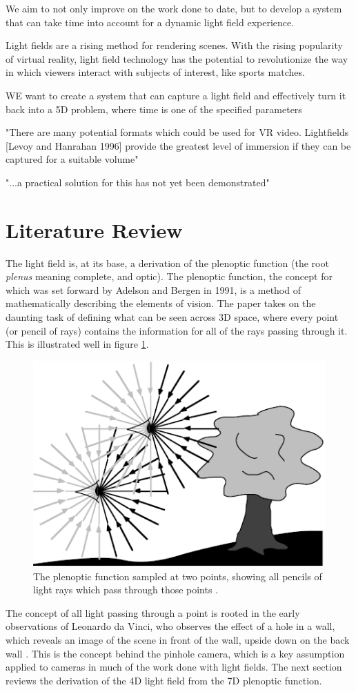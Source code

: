 \documentclass[12pt]{report}
\begin{document}
We aim to not only improve on the work done to date, but to develop a system that can take time into account for a dynamic light field experience. 

Light fields are a rising method for rendering scenes. With the rising popularity of virtual reality, light field technology has the potential to revolutionize the way in which viewers interact with subjects of interest, like sports matches.

WE want to create a system that can capture a light field and effectively turn it back into a 5D problem, where time is one of the specified parameters

"There are many potential formats which could be used for VR video.
Lightfields [Levoy and Hanrahan 1996] provide the greatest level of
immersion if they can be captured for a suitable volume"

"...a practical solution for this has not yet been demonstrated"

\chapter*{Literature Review}
The light field is, at its base, a derivation of the plenoptic function (the root \emph{plenus} meaning complete, and optic). The plenoptic function, the concept for which was set forward by Adelson and Bergen in 1991, is a method of mathematically describing the elements of vision. The paper takes on the daunting task of defining what can be seen across 3D space, where every point (or pencil of rays) contains the information for all of the rays passing through it.  This is illustrated well in figure  \ref{fig:plenoptic_visual}. 
\begin{figure}[!ht]
	\centering
	\includegraphics[scale=0.75]{plenoptic_image.png}
	\caption{The plenoptic function sampled at two points, showing all pencils of light rays which pass through those points \cite{Adelson91}.}
	\label{fig:plenoptic_visual}
\end{figure}
The concept of all light passing through a point is rooted in the early observations of Leonardo da Vinci, who observes the effect of a hole in a wall, which reveals an image of the scene in front of the wall, upside down on the back wall \cite{Adelson91}. This is the concept behind the pinhole camera, which is a key assumption applied to cameras in much of the work done with light fields. The next section reviews the derivation of the 4D light field from the 7D plenoptic function.  
\end{document}
